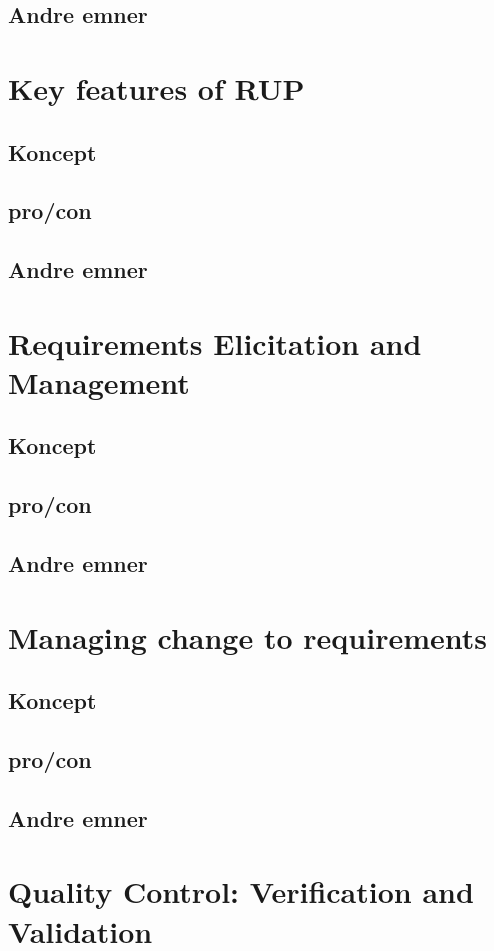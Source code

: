\documentclass[11pt,a4paper]{article}
\begin{document}
\subsection*{Andre emner}
\newpage
\section{Key features of RUP}
\subsection{Koncept}
\subsection{pro/con}
\subsection{Andre emner}
\newpage
\section{Requirements Elicitation and Management}
\subsection{Koncept}
\subsection{pro/con}
\subsection{Andre emner}
\newpage
\section{Managing change to requirements}
\subsection{Koncept}
\subsection{pro/con}
\subsection{Andre emner}
\newpage
\section{Quality Control: Verification and Validation}
\end{document}

